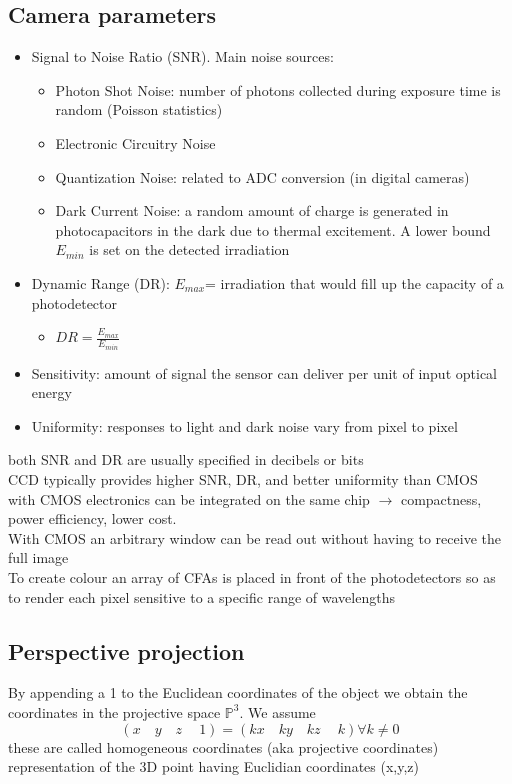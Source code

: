 \documentclass{article}
\begin{document}
\subsection{Camera parameters}
\begin{itemize}
	\item Signal to Noise Ratio (SNR). Main noise sources: \begin{itemize}
		\item Photon Shot Noise: number of photons collected during exposure time is random (Poisson statistics)
		\item Electronic Circuitry Noise
		\item Quantization Noise: related to ADC conversion (in digital cameras)
		\item Dark Current Noise: a random amount of charge is generated in photocapacitors in the dark due to thermal excitement. A lower bound $E_{min}$ is set on the detected irradiation
	\end{itemize}
	\item Dynamic Range (DR): $E_{max}$= irradiation that would fill up the capacity of a photodetector \begin{itemize}
		\item $DR=\frac{E_{max}}{E_{min}}$
		\end{itemize}
	\item Sensitivity: amount of signal the sensor can deliver per unit of input optical energy
	\item Uniformity: responses to light and dark noise vary from pixel to pixel
\end{itemize}
both SNR and DR are usually specified in decibels or bits\\
CCD typically provides higher SNR, DR, and better uniformity than CMOS\\
with CMOS electronics can be integrated on the same chip $\rightarrow$ compactness, power efficiency, lower cost.\\
With CMOS an arbitrary window can be read out without having to receive the full image\\
To create colour an array of CFAs is placed in front of the photodetectors so as to render each pixel sensitive to a specific range of wavelengths

\subsection{Perspective projection}
By appending a 1 to the Euclidean coordinates of the object we obtain the coordinates in the projective space $\mathbb{P}^3$. We assume
\begin{equation}
	(x \quad y \quad z \quad\ 1)=(kx \quad ky \quad kz \quad\ k) \forall k \neq 0
\end{equation}
these are called homogeneous coordinates (aka projective coordinates) representation of the 3D point having Euclidian coordinates (x,y,z)
\end{document}
